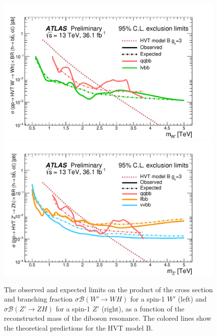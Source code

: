 \begin{figure}[!htb]
  \centering
    \includegraphics[width=.495\textwidth]{figures/ATLAS_Diboson_Summary_VH.pdf}%
    \includegraphics[width=.495\textwidth]{figures/ATLAS_Diboson_Summary_VV_ZP.pdf}
  \caption{The observed and expected limits on the product of the cross section and branching fraction $\sigma \mathcal{B} (W' \rightarrow WH)$ for a spin-1 $W'$ (left) and $\sigma \mathcal{B} (Z' \rightarrow ZH)$ for a spin-1 $Z'$ (right), as a function of the reconstructed mass of the diboson resonance. The colored lines show the theoretical predictions for the HVT model B.}
  \label{fig:theory_ATLAS_Diboson_Summary_VH}
\end{figure}

